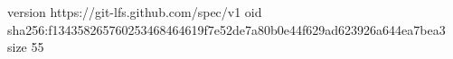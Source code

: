 version https://git-lfs.github.com/spec/v1
oid sha256:f134358265760253468464619f7e52de7a80b0e44f629ad623926a644ea7bea3
size 55
